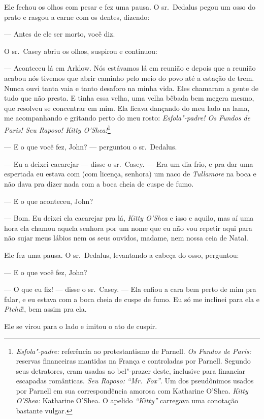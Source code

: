 Ele fechou os olhos com pesar e fez uma pausa. O sr.~Dedalus pegou um
osso do prato e rasgou a carne com os dentes, dizendo:

 --- Antes de ele ser morto, você diz.

O sr.~Casey abriu os olhos, suspirou e continuou:

 --- Aconteceu lá em Arklow. Nós estávamos lá em reunião e depois que a
reunião acabou nós tivemos que abrir caminho pelo meio do povo até a
estação de trem. Nunca ouvi tanta vaia e tanto desaforo na minha vida.
Eles chamaram a gente de tudo que não presta. E tinha essa velha, uma
velha bêbada bem megera mesmo, que resolveu se concentrar em mim. Ela
ficava dançando do meu lado na lama, me acompanhando e gritando perto
do meu rosto: \textit{Esfola"-padre! Os Fundos de Paris! Seu Raposo!
Kitty O’Shea!}\footnote{ \textit{Esfola"-padre:} referência ao
protestantismo de Parnell. \textit{Os Fundos de Paris:} reservas
financeiras mantidas na França e controladas por Parnell. Segundo seus
detratores, eram usadas ao bel"-prazer deste, inclusive para financiar
escapadas românticas. \textit{Seu Raposo:} \textit{“Mr.~Fox”}. Um dos
pseudônimos usados por Parnell em sua correspondência amorosa com
Katharine O’Shea. \textit{Kitty O’Shea:} Katharine O’Shea. O apelido
\textit{“Kitty”} carregava uma conotação bastante vulgar.}

 --- E o que você fez, John? --- perguntou o sr.~Dedalus.

 --- Eu a deixei cacarejar --- disse o sr.~Casey. --- Era um dia frio, e pra dar uma espertada eu estava com (com licença, senhora) um naco de
\textit{Tullamore} na boca e não dava pra dizer nada com a boca cheia
de cuspe de fumo.

 --- E o que aconteceu, John?

 --- Bom. Eu deixei ela cacarejar pra lá, \textit{Kitty
O’Shea} e isso e aquilo, mas aí uma hora ela chamou
aquela senhora por um nome que eu não vou repetir aqui para não sujar
meus lábios nem os seus ouvidos, madame, nem nossa ceia de Natal.

Ele fez uma pausa. O sr.~Dedalus, levantando a cabeça do osso,
perguntou:

 --- E o que você fez, John?

 --- O que eu fiz! --- disse o sr.~Casey. --- Ela enfiou a cara bem perto de mim pra falar, e eu estava com a boca cheia de cuspe de fumo. Eu só me inclinei para ela e \textit{Ptchú}!, bem assim pra ela.

Ele se virou para o lado e imitou o ato de cuspir.

